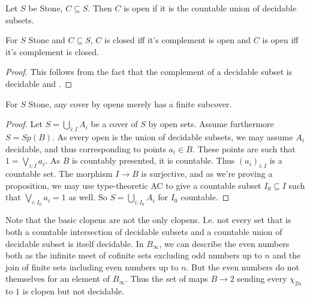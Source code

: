 \begin{definition}
  Let $S$ be Stone, $C\subseteq S$. 
  Then $C$ is open if it is the countable union of decidable subsets. 
\end{definition}
\begin{lemma}
  For $S$ Stone and $C\subseteq S$, 
  $C$ is closed iff it's complement is open 
  and $C$ is open iff it's complement is closed. 
\end{lemma}



\begin{proof}
  This follows from the fact that the complement of a decidable subset is decidable and 
  .
\end{proof}
\begin{lemma}
  For $S$ Stone, any cover by opens merely has a finite subcover.
\end{lemma}
\begin{proof}
  Let $S= \bigcup_{i:I} A_i$ be a cover of $S$ by open sets. 
  Assume furthermore $S= Sp(B)$. 
  As every open is the union of decidable subsets, we may assume $A_i$ decidable, 
  and thus corresponding to points $a_i \in B$. 
  These points are such that $1 = \bigvee_{i:I} a_i$. 
  As $B$ is countably presented, it is countable. 
  Thus $(a_i)_{i:I}$ is a countable set. 
  The morphism $I\to B$ is surjective, and as we're proving a proposition,
  we may use type-theoretic AC to give 
  a countable subset $I_0 \subseteq I$ such that $\bigvee_{i:I_0} a_i = 1$ as well. 
  So $S = \bigcup_{i:I_0} A_i$ for $I_0$ countable. 
\end{proof}

Note that the basic clopens are not the only clopens. 
I.e. not every set that is both a countable intersection of decidable subsets and 
a countable union of decidable subset is itself decidable. 
In $B_\infty$, we can describe the even numbers both as the infinite meet of cofinite sets excluding odd numbers up to $n$
and the join of finite sets including even numbers up to $n$. 
But the even numbers do not themselves for an element of $B_\infty$.
Thus the set of maps $B\to 2$ sending every $\chi_{2n}$ to $1$ is clopen but not decidable. 

%


